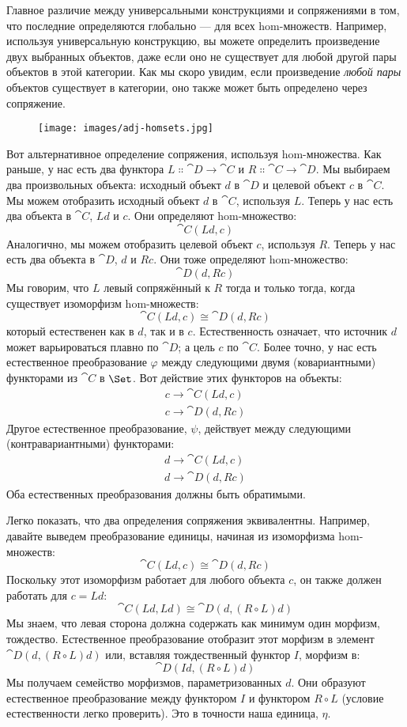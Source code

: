 Главное различие между универсальными конструкциями и сопряжениями в том,
что последние определяются глобально --- для всех hom-множеств. Например,
используя универсальную конструкцию, вы можете определить произведение двух выбранных
объектов, даже если оно не существует для любой другой пары объектов в этой
категории. Как мы скоро увидим, если произведение \emph{любой пары}
объектов существует в категории, оно также может быть определено через
сопряжение.

\begin{figure}[H]
  \centering
  \texttt{[image: images/adj-homsets.jpg]}
\end{figure}

\noindent
Вот альтернативное определение сопряжения, используя hom-множества. Как
раньше, у нас есть два функтора $L \Colon \cat{D} \to \cat{C}$ и
$R \Colon \cat{C} \to \cat{D}$. Мы выбираем два произвольных объекта:
исходный объект $d$ в $\cat{D}$ и целевой объект $c$
в $\cat{C}$. Мы можем отобразить исходный объект $d$ в $\cat{C}$, используя
$L$. Теперь у нас есть два объекта в $\cat{C}$, $L d$ и
$c$. Они определяют hom-множество:
\[\cat{C}(L d, c)\]
Аналогично, мы можем отобразить целевой объект $c$, используя $R$. Теперь
у нас есть два объекта в $\cat{D}$, $d$ и $R c$. Они
тоже определяют hom-множество:
\[\cat{D}(d, R c)\]
Мы говорим, что $L$ левый сопряжённый к $R$ тогда и только тогда, когда существует
изоморфизм hom-множеств:
\[\cat{C}(L d, c) \cong \cat{D}(d, R c)\]
который естественен как в $d$, так и в $c$.
Естественность означает, что источник $d$ может варьироваться плавно
по $\cat{D}$; а цель $c$ по $\cat{C}$. Более
точно, у нас есть естественное преобразование $\varphi$ между
следующими двумя (ковариантными) функторами из $\cat{C}$ в $\Set$. Вот
действие этих функторов на объекты:
\begin{gather*}
  c \to \cat{C}(L d, c) \\
  c \to \cat{D}(d, R c)
\end{gather*}
Другое естественное преобразование, $\psi$, действует между следующими
(контравариантными) функторами:
\begin{gather*}
  d \to \cat{C}(L d, c) \\
  d \to \cat{D}(d, R c)
\end{gather*}
Оба естественных преобразования должны быть обратимыми.

Легко показать, что два определения сопряжения
эквивалентны. Например, давайте выведем преобразование единицы, начиная
из изоморфизма hom-множеств:
\[\cat{C}(L d, c) \cong \cat{D}(d, R c)\]
Поскольку этот изоморфизм работает для любого объекта $c$, он также должен
работать для $c = L d$:
\[\cat{C}(L d, L d) \cong \cat{D}(d, (R \circ L) d)\]
Мы знаем, что левая сторона должна содержать как минимум один морфизм,
тождество. Естественное преобразование отобразит этот морфизм в
элемент $\cat{D}(d, (R \circ L) d)$ или, вставляя тождественный
функтор $I$, морфизм в:
\[\cat{D}(I d, (R \circ L) d)\]
Мы получаем семейство морфизмов, параметризованных $d$. Они образуют
естественное преобразование между функтором $I$ и функтором
$R \circ L$ (условие естественности легко проверить). Это
в точности наша единица, $\eta$.

